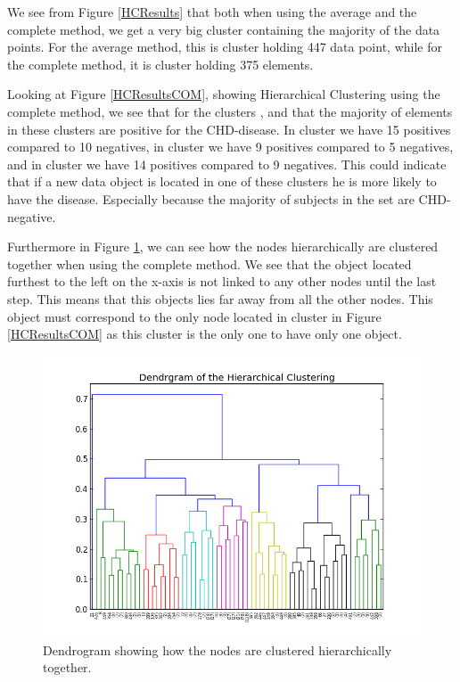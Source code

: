 We see from Figure \ref{HCResults} that both when using the average and the complete method, we get a very big cluster containing the majority of the data points. For the average method, this is cluster \HCAVGD{} holding 447 data point, while for the complete method, it is cluster \HCCOMD{}  holding 375 elements.

Looking at Figure \ref{HCResultsCOM}, showing Hierarchical Clustering using the complete method, we see that for the clusters \HCCOMA{}, \HCCOMB{} and \HCCOMC{} that the majority of elements in these clusters are positive for the CHD-disease. In cluster \HCCOMA{} we have 15 positives compared to 10 negatives, in cluster \HCCOMB{} we have 9 positives compared to 5 negatives, and in cluster \HCCOMC{} we have 14 positives compared to 9 negatives. This could indicate that if a new data object is located in one of these clusters he is more likely to have the disease. Especially because the majority of subjects in the set are CHD-negative.

Furthermore in Figure \ref{dendrogram}, we can see how the nodes hierarchically are clustered together when using the complete method. We see that the object located furthest to the left on the x-axis is not linked to any other nodes until the last step. This means that this objects lies far away from all the other nodes. This object must correspond to the only node located in cluster \HCCOMS{} in Figure \ref{HCResultsCOM} as this cluster is the only one to have only one object.

\begin{figure}[H]
\includegraphics[scale=0.5]{pictures/dendrogram.png}
\caption{\footnotesize Dendrogram showing how the nodes are clustered hierarchically together.}
\label{dendrogram}
\end{figure}



